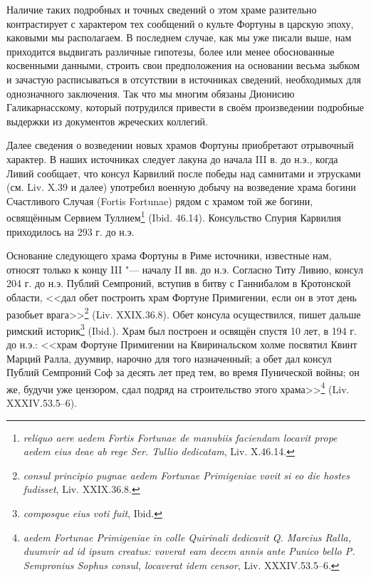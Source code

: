 


Наличие таких подробных и точных сведений о этом храме разительно контрастирует с характером тех сообщений о культе Фортуны в царскую эпоху, каковыми мы располагаем. В последнем случае, как мы уже писали выше, нам приходится выдвигать различные гипотезы, более или менее обоснованные косвенными данными, строить свои предположения на основании весьма зыбком и зачастую расписываться в отсутствии в источниках сведений, необходимых для однозначного заключения. Так что мы многим обязаны Дионисию Галикарнасскому, который потрудился привести в своём произведении подробные выдержки из документов жреческих коллегий. 




Далее сведения о возведении новых храмов Фортуны приобретают отрывочный характер. В наших источниках следует лакуна до начала III в. до н.э., когда Ливий сообщает, что консул Карвилий после победы над самнитами и этрусками (см. Liv. X.39 и далее) употребил военную добычу на возведение храма богини Счастливого Случая (Fortis Fortunae) рядом с храмом той же богини, освящённым Сервием Туллием\footnote{\textit{reliquo aere aedem Fortis Fortunae de manubiis faciendam locavit prope aedem eius deae ab rege Ser. Tullio dedicatam}, Liv. X.46.14.} (Ibid. 46.14). Консульство Спурия Карвилия приходилось на 293 г. до н.э.


Основание следующего храма\label{FortunaPrimigenia} Фортуны в Риме источники, известные нам, относят только к концу III "--- началу II вв. до н.э. Согласно Титу Ливию, консул 204 г. до н.э. Публий Семпроний, вступив в битву с Ганнибалом в Кротонской области, <<дал обет построить храм Фортуне Примигении, если он в этот день разобьет врага>>\footnote{\textit{consul principio pugnae aedem Fortunae Primigeniae vovit si eo die hostes fudisset}, Liv. XXIX.36.8.} (Liv. XXIX.36.8). Обет консула осуществился, пишет дальше римский историк\footnote{\textit{composque eius voti fuit}, Ibid.} (Ibid.). Храм был построен и освящён спустя 10 лет, в 194 г. до н.э.: <<храм Фортуне Примигении на Квиринальском холме посвятил Квинт Марций Ралла, дуумвир, нарочно для того назначенный; а обет дал консул Публий Семпроний Соф за десять лет пред тем, во время Пунической войны; он же, будучи уже цензором, сдал подряд на строительство этого храма>>\footnote{\textit{aedem Fortunae Primigeniae in colle Quirinali dedicavit Q. Marcius Ralla, duumvir ad id ipsum creatus: voverat eam decem annis ante Punico bello P. Sempronius Sophus consul, locaverat idem censor}, Liv. XXXIV.53.5--6.} (Liv. XXXIV.53.5--6).

